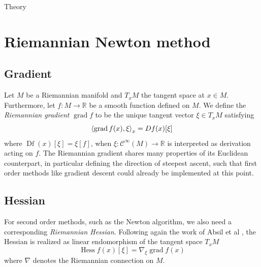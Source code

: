 \begin{chapter}{Theory}
\section{Riemannian Newton method} %
\label{sec:Riemannian Newton method}

\subsection{Gradient} %
\label{sub:Gradient}
Let $M$ be a Riemannian manifold and $T_xM$ the tangent space at $x\in M$. Furthermore, let $f: M\to\mathbb{R}$ be a smooth function defined on $M$.
We define the \emph{Riemannian gradient} $\operatorname{grad} f$ to be the unique tangent vector $\xi\in T_xM$ satisfying 
\begin{equation}
    \label{eq:gradient}
    \left\langle \operatorname{grad}f(x),\xi \right\rangle_x=\mathop{Df}(x)[\xi]
\end{equation}
where $\mathop{Df}(x)[\xi] = \xi[f]$, when $\xi:\mathcal{C}^{\infty}(M)\to\mathbb{R}$ is interpreted as derivation acting on $f$. The Riemannian gradient
shares many properties of its Euclidean counterpart, in particular defining the direction of steepest ascent, such that first order methods like
gradient descent could already be implemented at this point.\\

\subsection{Hessian} %
\label{sub:Hessian}
For second order methods, such as the Newton algorithm, we also need a corresponding \emph{Riemannian Hessian}. Following again the work 
of Absil et al \cite{Absil2009}, the Hessian is realized as linear endomorphism of the tangent space $T_xM$
\begin{equation}
    \label{eq:hessian}
    \operatorname{Hess}f(x)[\xi]=\nabla_{\xi}\operatorname{grad}f(x)
\end{equation}
where $\nabla$ denotes the Riemannian connection on $M$.\\


\end{chapter}
